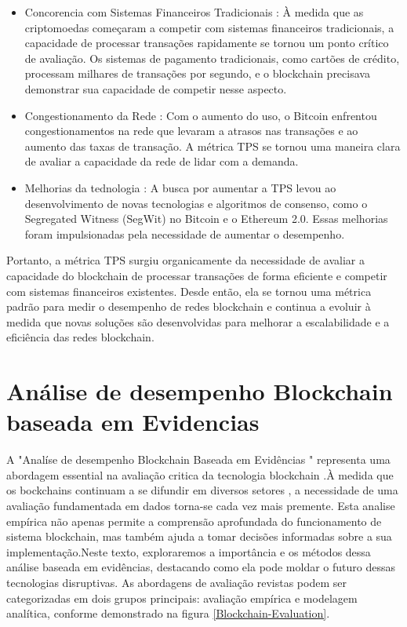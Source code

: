     \begin{itemize}
    \item Concorencia com Sistemas Financeiros Tradicionais : À medida que as criptomoedas começaram a competir com sistemas financeiros tradicionais, a capacidade de processar transações rapidamente se tornou um ponto crítico de avaliação. Os sistemas de pagamento tradicionais, como cartões de crédito, processam milhares de transações por segundo, e o blockchain precisava demonstrar sua capacidade de competir nesse aspecto.
    
    \item Congestionamento da Rede : Com o aumento do uso, o Bitcoin enfrentou congestionamentos na rede que levaram a atrasos nas transações e ao aumento das taxas de transação. A métrica TPS se tornou uma maneira clara de avaliar a capacidade da rede de lidar com a demanda. 
    \item Melhorias da tednologia : A busca por aumentar a TPS levou ao desenvolvimento de novas tecnologias e algoritmos de consenso, como o Segregated Witness (SegWit) no Bitcoin e o Ethereum 2.0. Essas melhorias foram impulsionadas pela necessidade de aumentar o desempenho.
    
    \end{itemize}
    Portanto, a métrica TPS surgiu organicamente da necessidade de avaliar a capacidade do blockchain de processar transações de forma eficiente e competir com sistemas financeiros existentes. Desde então, ela se tornou uma métrica padrão para medir o desempenho de redes blockchain e continua a evoluir à medida que novas soluções são desenvolvidas para melhorar a escalabilidade e a eficiência das redes blockchain.

    \section{Análise de desempenho Blockchain baseada em Evidencias}

    A "Analíse de desempenho Blockchain Baseada em Evidências " representa uma abordagem essential na avaliação critica da tecnologia blockchain .À medida que os bockchains continuam a se difundir em diversos setores , a necessidade de uma avaliação fundamentada em dados torna-se cada vez mais premente. Esta analise empírica não apenas permite a comprensão aprofundada do funcionamento de sistema blockchain, mas também ajuda a tomar decisões informadas sobre a sua implementação.Neste texto, exploraremos a importância e os métodos dessa análise baseada em evidências, destacando como ela pode moldar o futuro dessas tecnologias disruptivas. 
    As abordagens de avaliação revistas podem ser categorizadas em dois grupos principais: avaliação empírica e modelagem analítica, conforme demonstrado na figura  \ref{Blockchain-Evaluation}.

